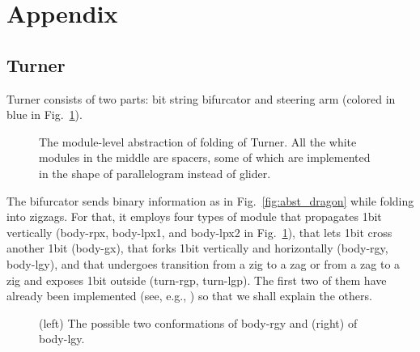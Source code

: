 \section*{Appendix}
\subsection{Turner}
Turner consists of two parts: bit string bifurcator and steering arm (colored in blue in Fig.~\ref{over_all}).
\begin{figure}[t]
 \centering
{}
 \caption{The module-level abstraction of folding of Turner.
 All the white modules in the middle are spacers, some of which are implemented in the shape of parallelogram instead of glider. 
 }
\label{over_all}
\end{figure}

The bifurcator sends binary information as in Fig.~\ref{fig:abst_dragon} while folding into zigzags.
For that, it employs four types of module that propagates 1bit vertically (body-rpx, body-lpx1, and body-lpx2 in Fig.~\ref{over_all}), that lets 1bit cross another 1bit (body-gx), that forks 1bit vertically and horizontally (body-rgy, body-lgy), and that undergoes transition from a zig to a zag or from a zag to a zig and exposes 1bit outside (turn-rgp, turn-lgp).
The first two of them have already been implemented (see, e.g., \cite{HaKiOtSe2016}) so that we shall explain the others.

\begin{figure}[t]
 \centering
{}
 \caption{(left) The possible two conformations of body-rgy and (right) of body-lgy.}
\label{body-y}
\end{figure}

